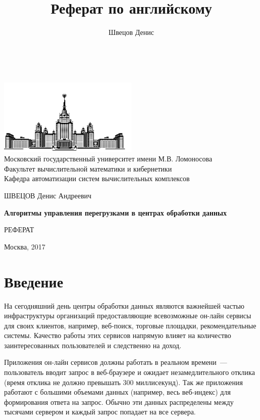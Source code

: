 \documentclass[14pt, a4paper,oneside]{extarticle}
\author{Швецов Денис}
\title{Реферат по английскому}
\begin{document}
\thispagestyle{empty}

	\thispagestyle{empty}
	
	\begin{center}
		\ \vspace{-0.5cm}
		
		\includegraphics[width=0.5\textwidth]{msu}\\
		{Московский государственный университет имени М.В. Ломоносова}\\
		Факультет вычислительной математики и кибернетики\\
		Кафедра автоматизации систем вычислительных комплексов
		
		\vspace{2.5cm}
		
		{\Large ШВЕЦОВ Денис Андреевич}
		
		\vspace{1cm}
		
		{\Large\bfseries
			Алгоритмы управления перегрузками в центрах обработки данных\\}
		
		\vspace{2cm}
		
		{\large РЕФЕРАТ}
	\end{center}
	\vfill
	\begin{center}
		Москва, 2017
	\end{center}
	\vspace{1cm}
	\enlargethispage{4\baselineskip}

\section{Введение}

На сегодняшний день центры обработки данных являются важнейшей частью инфраструктуры организаций предоставляющие всевозможные он-лайн сервисы для своих клиентов, например, веб-поиск, торговые площадки, рекомендательные системы. Качество работы этих сервисов напрямую влияет на количество заинтересованных пользователей и следственно на доход. 

Приложения он-лайн сервисов должны работать в реальном времени~--- пользователь вводит запрос в веб-браузере и ожидает незамедлительного отклика (время отклика не должно превышать 300 миллисекунд). 
Так же приложения работают с большими объемами данных (например, весь веб-индекс) для формирования ответа на запрос. Обычно эти данных распределены между тысячами сервером и каждый запрос попадает на все сервера.
\end{document}
